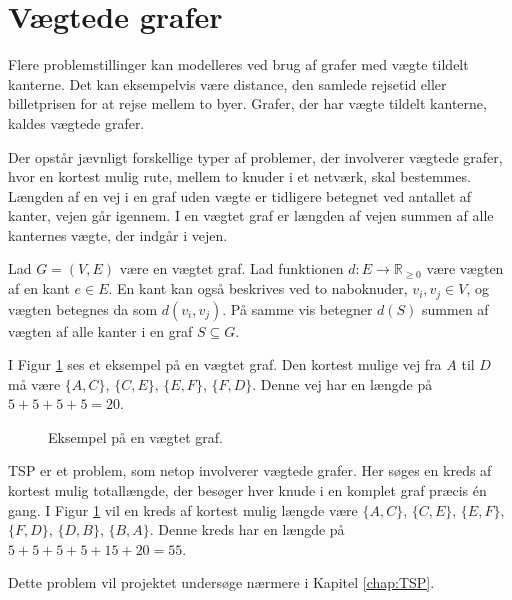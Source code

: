 \section{Vægtede grafer}

Flere problemstillinger kan modelleres ved brug af grafer med vægte tildelt kanterne. 
Det kan eksempelvis være distance, den samlede rejsetid eller billetprisen for at rejse mellem to byer. 
Grafer, der har vægte tildelt kanterne, kaldes vægtede grafer. 

Der opstår jævnligt forskellige typer af problemer, der involverer vægtede grafer, hvor en kortest mulig rute, mellem to knuder i et netværk, skal bestemmes. 
Længden af en vej i en graf uden vægte er tidligere betegnet ved antallet af kanter, vejen går igennem.
I en vægtet graf er længden af vejen summen af alle kanternes vægte, der indgår i vejen.

\begin{defn}
	Lad $G = (V,E)$ være en vægtet graf. Lad funktionen $d : E \to \mathbb{R}_{\geq 0}$ være vægten af en kant $e \in E$. En kant kan også beskrives ved to naboknuder, $v_i, v_j \in V$, og vægten betegnes da som $d(v_i, v_j)$.
	På samme vis betegner $d(S)$ summen af vægten af alle kanter i en graf $S \subseteq G$.
\end{defn}

\begin{exmp}
I Figur \ref{fig:weighted_graph} ses et eksempel på en vægtet graf. Den kortest mulige vej fra $A$ til $D$ må være $\lbrace A,C \rbrace$, $\lbrace C,E \rbrace$, $\lbrace E,F \rbrace$, $\lbrace F,D \rbrace$. Denne vej har en længde på $5+5+5+5=20$. 
\end{exmp}

\begin{figure}[h!]
	\centering
	
	\caption{Eksempel på en vægtet graf.} \label{fig:weighted_graph}
\end{figure}

TSP er et problem, som netop involverer vægtede grafer. Her søges en kreds af kortest mulig totallængde, der besøger hver knude i en komplet graf præcis én gang.
I Figur \ref{fig:weighted_graph} vil en kreds af kortest mulig længde være $\lbrace A,C \rbrace$, $\lbrace C,E \rbrace$, $\lbrace E,F \rbrace$, $\lbrace F,D \rbrace$, $\lbrace D,B \rbrace$, $\lbrace B,A \rbrace$.
Denne kreds har en længde på $5+5+5+5+15+20=55$.

Dette problem vil projektet undersøge nærmere i Kapitel \ref{chap:TSP}.

